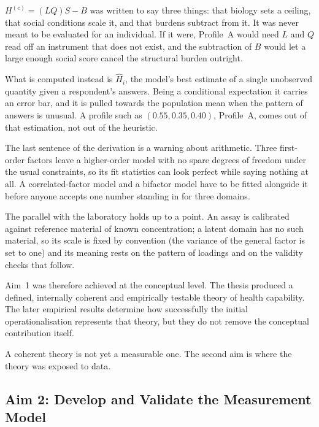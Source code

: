 \begin{reading}
$H^{(c)}=(LQ)S-B$ was written to say three things: that biology sets a ceiling,
that social conditions scale it, and that burdens subtract from it. It was
never meant to be evaluated for an individual. If it were, Profile~A would
need $L$ and $Q$ read off an instrument that does not exist, and the
subtraction of $B$ would let a large enough social score cancel the structural
burden outright.

What is computed instead is $\widehat H_i$, the model's best estimate of a
single unobserved quantity given a respondent's answers. Being a conditional
expectation it carries an error bar, and it is pulled towards the population
mean when the pattern of answers is unusual. A profile such as
$(0.55,0.35,0.40)$, Profile~A, comes out of that estimation, not out of the
heuristic.

The last sentence of the derivation is a warning about arithmetic. Three
first-order factors leave a higher-order model with no spare degrees of freedom
under the usual constraints, so its fit statistics can look perfect while
saying nothing at all. A correlated-factor model and a bifactor model have to
be fitted alongside it before anyone accepts one number standing in for three
domains.

The parallel with the laboratory holds up to a point. An assay is calibrated
against reference material of known concentration; a latent domain has no such
material, so its scale is fixed by convention (the variance of the general
factor is set to one) and its meaning rests on the pattern of loadings and on
the validity checks that follow.
\end{reading}

Aim~1 was therefore achieved at the conceptual level. The thesis produced a defined, internally coherent and empirically testable theory of health capability. The later empirical results determine how successfully the initial operationalisation represents that theory, but they do not remove the conceptual contribution itself.

A coherent theory is not yet a measurable one. The second aim is where the
theory was exposed to data.

\subsection{Aim 2: Develop and Validate the Measurement Model}

